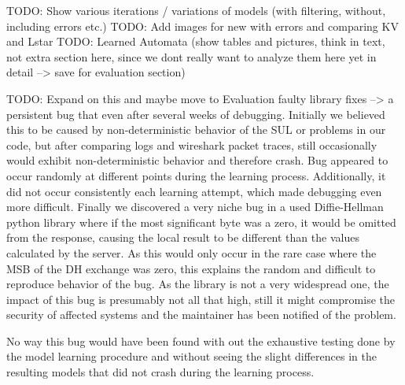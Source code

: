 TODO: Show various iterations / variations of models (with filtering, without, including errors etc.) TODO: Add images for new with errors and comparing KV and Lstar
TODO: Learned Automata (show tables and pictures, think in text, not extra section here, since we dont really want to analyze them here yet in detail --> save for evaluation section)

TODO: Expand on this and maybe move to Evaluation
 faulty library fixes --> a persistent bug that even after several weeks of debugging. Initially we believed this to be caused by non-deterministic behavior of the SUL or problems in our code, but after comparing logs and wireshark packet traces, still occasionally would exhibit non-deterministic behavior and therefore crash. Bug appeared to occur randomly at different points during the learning process. Additionally, it did not occur consistently each learning attempt, which made debugging even more difficult. Finally we discovered a very niche bug in a used Diffie-Hellman python library where if the most significant byte was a zero, it would be omitted from the response, causing the local result to be different than the values calculated by the server. As this would only occur in the rare case where the MSB of the DH exchange was zero, this explains the random and difficult to reproduce behavior of the bug. As the library is not a very widespread one, the impact of this bug is presumably not all that high, still it might compromise the security of affected systems and the maintainer has been notified of the problem.

No way this bug would have been found with out the exhaustive testing done by the model learning procedure and without seeing the slight differences in the resulting models that did not crash during the learning process.

